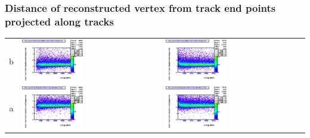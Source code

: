 \documentclass{beamer}
\begin{document}
\begin{frame}
	\frametitle{Distance of reconstructed vertex from track end points projected along tracks}
	\begin{tabular}{|C|V|V|}
		\hline
		& &\\
		\hline
		b &
		\includegraphics[width=0.45\textwidth]{nue_H1_reconVertexProjectedDistFromTrackEndAlongTrack_onlyCC_maxR600cm.eps} &
		\includegraphics[width=0.45\textwidth]{nue_C12_reconVertexProjectedDistFromTrackEndAlongTrack_onlyCC_maxR600cm.eps} \\
		\hline
		a &
		\includegraphics[width=0.45\textwidth]{nue_H1_reconVertexProjectedDistFromTrackStartAlongTrack_onlyCC_maxR600cm.eps} &
		\includegraphics[width=0.45\textwidth]{nue_C12_reconVertexProjectedDistFromTrackStartAlongTrack_onlyCC_maxR600cm.eps} \\
		\hline
	\end{tabular}
\end{frame}
\end{document}
